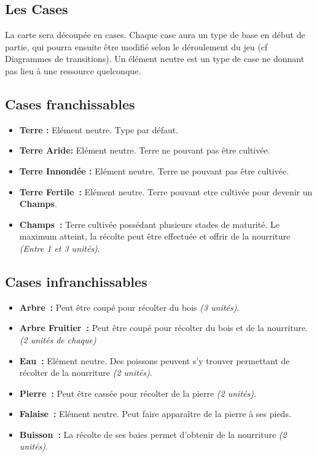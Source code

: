 \documentclass[a4paper]{article}
\begin{document}
\subsection*{Les Cases}

La carte sera découpée en cases. Chaque case aura un type de base en début de partie, qui pourra ensuite être modifié selon le déroulement du jeu (cf Diagrammes de transitions). Un élément neutre est un type de case ne donnant pas lieu à une ressource quelconque.

\subsection*{Cases franchissables}
\begin{itemize}
\item \textbf{Terre :} \small{ Elément neutre. Type par défaut.}
\item \textbf{Terre Aride:} \small{ Elément neutre. Terre ne pouvant pas être cultivée.}
\item \textbf{Terre Innondée :} \small{ Elément neutre. Terre ne pouvant pas être cultivée.}
\item \textbf{Terre Fertile :} \small{ Elément neutre. Terre pouvant etre cultivée pour devenir un \textbf{Champs}.}
\item \textbf{Champs :} \small{ Terre cultivée possédant plusieurs stades de maturité. Le maximum atteint, la récolte peut être effectuée et offrir de la nourriture \textit{(Entre 1 et 3 unités)}.}
\end{itemize}

\subsection*{Cases infranchissables}
\begin{itemize}
\item \textbf{Arbre :} \small{ Peut être coupé pour récolter du bois \textit{(3 unités)}.}
\item \textbf{Arbre Fruitier :} \small{ Peut être coupé pour récolter du bois et de la nourriture. \textit{(2 unités de chaque)}}
\item \textbf{Eau :} \small{ Elément neutre. Des poissons peuvent s'y trouver permettant de récolter de la nourriture \textit{(2 unités)}.}
\item \textbf{Pierre :} \small{ Peut être cassée pour récolter de la pierre \textit{(2 unités)}.}
\item \textbf{Falaise :} \small{ Elément neutre. Peut faire apparaître de la pierre à ses pieds.}
\item \textbf{Buisson :} \small{ La récolte de ses baies permet d'obtenir de la nourriture \textit{(2 unités)}.}
\end{itemize}
\end{document}
